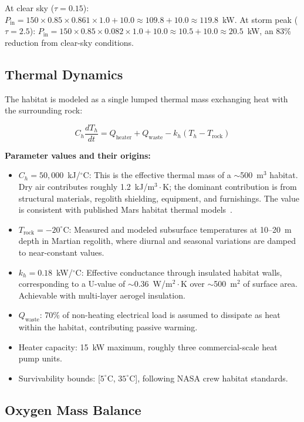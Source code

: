 \documentclass[11pt,a4paper]{article}
\begin{document}
At clear sky ($\tau = 0.15$): $P_{\text{in}} = 150 \times 0.85 \times 0.861 \times 1.0 + 10.0 \approx 109.8 + 10.0 \approx 119.8$~kW. At storm peak ($\tau = 2.5$): $P_{\text{in}} = 150 \times 0.85 \times 0.082 \times 1.0 + 10.0 \approx 10.5 + 10.0 \approx 20.5$~kW, an 83\% reduction from clear-sky conditions.

\subsection{Thermal Dynamics}

The habitat is modeled as a single lumped thermal mass exchanging heat with the surrounding rock:

\begin{equation}\label{eq:thermal}
  C_h \frac{dT_h}{dt} = Q_{\text{heater}} + Q_{\text{waste}} - k_h (T_h - T_{\text{rock}})
\end{equation}

\textbf{Parameter values and their origins:}
\begin{itemize}
  \item $C_h = 50,\!000$~kJ/$^\circ$C: This is the effective thermal mass of a $\sim$500~m$^3$ habitat. Dry air contributes roughly 1.2~kJ/m$^3\!\cdot\!$K; the dominant contribution is from structural materials, regolith shielding, equipment, and furnishings. The value is consistent with published Mars habitat thermal models~\cite{mars_thermal}.
  \item $T_{\text{rock}} = -20^\circ$C: Measured and modeled subsurface temperatures at 10--20~m depth in Martian regolith, where diurnal and seasonal variations are damped to near-constant values.
  \item $k_h = 0.18$~kW/$^\circ$C: Effective conductance through insulated habitat walls, corresponding to a U-value of $\sim$0.36~W/m$^2\!\cdot\!$K over $\sim$500~m$^2$ of surface area. Achievable with multi-layer aerogel insulation.
  \item $Q_{\text{waste}}$: 70\% of non-heating electrical load is assumed to dissipate as heat within the habitat, contributing passive warming.
  \item Heater capacity: 15~kW maximum, roughly three commercial-scale heat pump units.
  \item Survivability bounds: [$5^\circ$C, $35^\circ$C], following NASA crew habitat standards.
\end{itemize}

\subsection{Oxygen Mass Balance}
\end{document}
